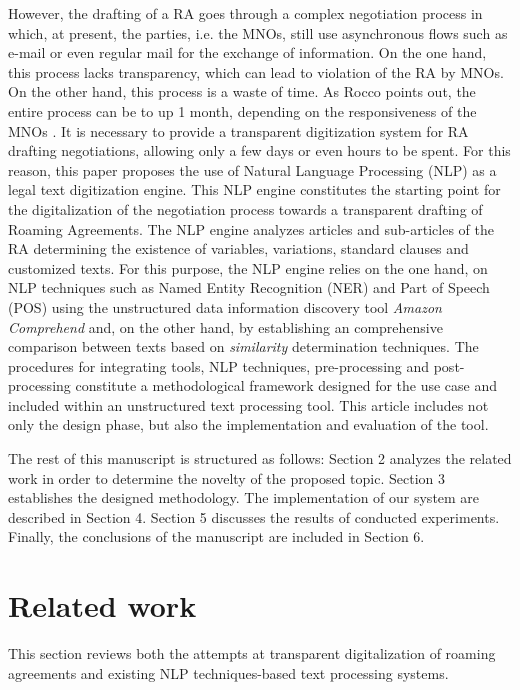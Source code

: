\documentclass[conference]{style/IEEEtran}
\begin{document}
However, the drafting of a RA goes through a complex negotiation process in which, at present, the parties, i.e. the MNOs, still use asynchronous flows such as e-mail or even regular mail for the exchange of information. On the one hand, this process lacks transparency, which can lead to violation of the RA by MNOs. On the other hand, this process is a waste of time. As Rocco points out, the entire process can be to up 1 month, depending on the responsiveness of the MNOs \cite{ROCCO2017a}. It is necessary to provide a transparent digitization system for RA drafting negotiations, allowing only a few days or even hours to be spent. For this reason, this paper proposes the use of Natural Language Processing (NLP) as a legal text digitization engine. This NLP engine constitutes the starting point for the digitalization of the negotiation process towards a transparent drafting of Roaming Agreements. The NLP engine analyzes articles and sub-articles of the RA determining the existence of variables, variations, standard clauses and customized texts. For this purpose, the NLP engine relies on the one hand, on NLP techniques such as Named Entity Recognition (NER) and Part of Speech (POS) using the unstructured data information discovery tool \textit{Amazon Comprehend} and, on the other hand, by establishing an comprehensive comparison between texts based on \textit{similarity} determination techniques. The procedures for integrating tools, NLP techniques, pre-processing and post-processing constitute a methodological framework designed for the use case and included within an unstructured text processing tool. This article includes not only the design phase, but also the implementation and evaluation of the tool.

The rest of this manuscript is structured as follows: Section 2 analyzes the related work in order to determine the novelty of the proposed topic. Section 3 establishes the designed methodology. The implementation of our system are described in Section 4. Section 5 discusses the results of conducted experiments. Finally, the conclusions of the manuscript are included in Section 6.

\section{Related work}

This section reviews both the attempts at transparent digitalization of roaming agreements and existing NLP techniques-based text processing systems.
\end{document}
